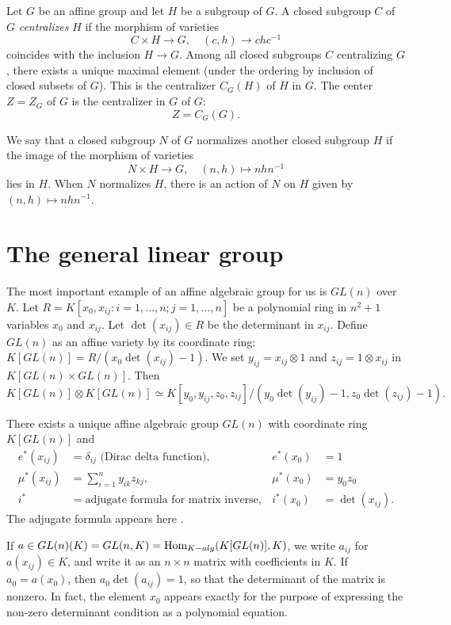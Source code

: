 Let $G$ be an affine group and let $H$ be a subgroup of $G$.  A closed
subgroup $C$ of $G$ {\it centralizes} $H$ if the morphism of varieties
\[
C \times H \to G, \quad (c,h)\to c h c^{-1}
\]
coincides with the inclusion $H\to G$.  Among all closed subgroups $C$
centralizing $G$, there exists a unique maximal element (under the
ordering by inclusion of closed subsets of $G$).  This is the
centralizer $C_G(H)$ of $H$ in $G$.  The center $Z = Z_G$ of $G$ is
the centralizer in $G$ of $G$:
\[
Z = C_G(G).
\]

We say that a closed subgroup $N$ of $G$ normalizes another closed
subgroup $H$ if the image of the morphism of varieties
\[
N \times H \to G,\quad (n,h) \mapsto n h n^{-1}
\]
lies in $H$.  When $N$ normalizes $H$, there is an action of
$N$ on $H$ given by $(n,h) \mapsto n h n^{-1}$.


\section{The general linear group}

The most important example of an affine algebraic group for us is
$GL(n)$ over $K$.  Let $R=K[x_0,x_{ij}:i=1,\ldots,n;j=1,\ldots,n]$ be
a polynomial ring in $n^2+1$ variables $x_0$ and $x_{ij}$.  Let
$\det(x_{ij})\in R$ be the determinant in $x_{ij}$.  Define $GL(n)$ as
an affine variety by its coordinate ring: $K[GL(n)] =
R/(x_0\det(x_{ij}) - 1)$.  We set $y_{ij} = x_{ij}\otimes 1$ and
$z_{ij} = 1\otimes x_{ij}$ in $K[GL(n)\times GL(n)]$.  Then
\[
K[GL(n)]\otimes K[GL(n)] \simeq
K[y_0,y_{ij},z_0,z_{ij}]/(y_0 \det(y_{ij})-1,z_0\det(z_{ij})-1).
\]

There exists a unique affine algebraic group $GL(n)$ with coordinate
ring $K[GL(n)]$ and
\begin{align*}
  e^*(x_{ij}) &= \delta_{ij} \text{ (Dirac delta function)},&e^*(x_0) &= 1\\
  \mu^*(x_{ij}) &= \sum_{i=1}^n {y_{ik} z_{kj}},&\mu^*(x_0) &= y_0 z_0\\
  i^* &= \text{adjugate formula for matrix inverse},&i^*(x_0)&=\det(x_{ij}).
\end{align*}
The adjugate formula appears here \cite{WA}.

If $a \in GL(n)(K) = GL(n,K) = \text{Hom}_{K-alg}(K[GL(n)],K)$, we write
$a_{ij}$ for $a(x_{ij})\in K$, and write it as an $n\times n$ matrix
with coefficients in $K$.  If $a_0 = a(x_0)$, then
$a_0\det(a_{ij})=1$, so that the determinant of the matrix is nonzero.
In fact, the element $x_0$ appears exactly for the purpose of
expressing the non-zero determinant condition as a polynomial
equation.


